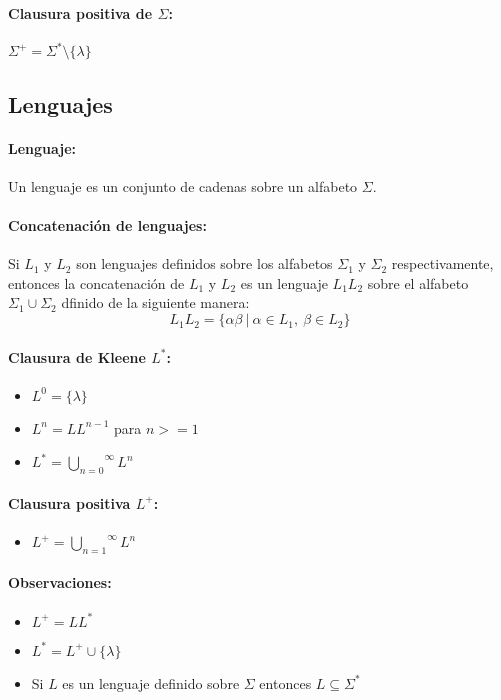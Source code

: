 \paragraph{Clausura positiva de \(\Sigma\):} \(\Sigma^+ = \Sigma^*\setminus\{\lambda\}\)

\subsection{Lenguajes}
\paragraph{Lenguaje:} Un lenguaje es un conjunto de cadenas sobre un alfabeto \(\Sigma\).

\paragraph{Concatenación de lenguajes:} Si \(L_1\) y \(L_2\) son lenguajes definidos sobre los alfabetos \(\Sigma_1\) y \(\Sigma_2\) respectivamente, entonces la concatenación de \(L_1\) y \(L_2\) es un lenguaje \(L_1L_2\) sobre el alfabeto \( \Sigma_1\cup\Sigma_2\) dfinido de la siguiente manera:
\[ L_1L_2 = \{ \alpha\beta~|~\alpha\in L_1,~\beta\in L_2\}\]

\paragraph*{Clausura de Kleene \(L^*\):}
\begin{itemize}
  \item[] \(L^0 = \{\lambda\}\)
  \item[] \(L^n = LL^{n-1}\) para \(n>=1\)
  \item[] \(L^* = \overset{\infty}{\underset{n=0}{\bigcup}} L^n\)
\end{itemize}

\paragraph{Clausura positiva \(L^+\):}
\begin{itemize}
  \item[] \(L^+ = \overset{\infty}{\underset{n=1}{\bigcup}} L^n\)
\end{itemize}
\paragraph*{Observaciones:}
\begin{itemize}
  \item \(L^+ = LL^*\)
  \item \(L^* = L^+\cup\{\lambda\}\)
  \item Si \(L\) es un lenguaje definido sobre \(\Sigma\) entonces \(L\subseteq\Sigma^*\)
\end{itemize}

